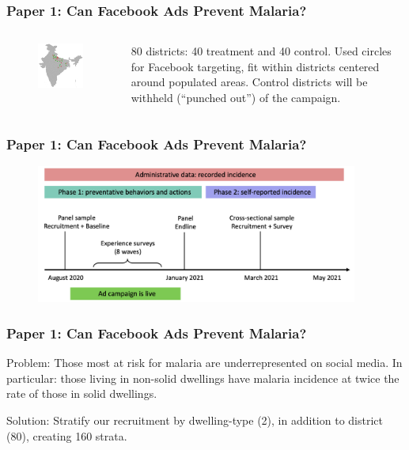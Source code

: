\documentclass[aspectratio=169]{beamer}
\begin{document}
\begin{frame}
\frametitle{Paper 1: Can Facebook Ads Prevent Malaria?}

\begin{columns}
\begin{figure}[]
\includegraphics[width=200px]{resources/india-targeting-surveys-only.png} 
\end{figure}    

80 districts: 40 treatment and 40 control. Used circles for Facebook targeting, fit within districts centered around populated areas. Control districts will be withheld (``punched out'') of the campaign. 
\end{columns}
\end{frame}


\begin{frame}
\frametitle{Paper 1: Can Facebook Ads Prevent Malaria?}

\begin{figure}[]
\includegraphics[width=400px]{resources/Timeline.png} 
\end{figure}    
  
\end{frame}


\begin{frame}
\frametitle{Paper 1: Can Facebook Ads Prevent Malaria?}
Problem: Those most at risk for malaria are underrepresented on social media. In particular: those living in non-solid dwellings have malaria incidence at twice the rate of those in solid dwellings.

Solution: Stratify our recruitment by dwelling-type (2), in addition to district (80), creating 160 strata. 
  
\end{frame}
\end{document}
